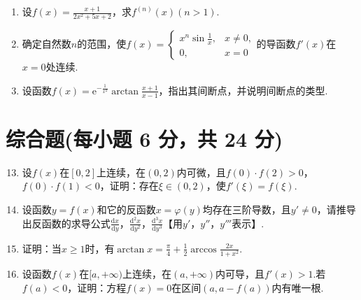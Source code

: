 \documentclass[../Main.tex]{subfiles}
\begin{document}
\begin{enumerate}
    \item 设$f(x)=\frac{x+1}{2x^{2}+5x+2}$，求$f^{(n)}(x)(n>1)$.
          \vspace{8em}

    \item 确定自然数$n$的范围，使$f(x)=
              \begin{cases}
                  x^{n} \sin\frac{1}{x}, & x\neq0, \\
                  0,                     & x=0
              \end{cases}$的导函数$f'(x)$在$x=0$处连续.
          \vspace{8em}

    \item 设函数$f(x)=\mathrm{e}^{-\frac{1}{x^{2}}}\arctan\frac{x+1}{x-1}$，指出其间断点，并说明间断点的类型.
          \vspace{8em}
\end{enumerate}

\section{综合题(每小题 6 分，共 24 分)}
\begin{enumerate}
    \setcounter{enumi}{12}
    \item 设$f(x)$在$[0,2]$上连续，在$(0,2)$内可微，且$f(0)\cdot f(2)>0$，$f
              (0)\cdot f(1)<0$，证明：存在$\xi\in(0,2)$，使$f'(\xi)=f(\xi)$.
          \vspace{9em}

    \item 设函数$y=f(x)$和它的反函数$x=\varphi(y)$均存在三阶导数，且$y'\neq0$，请推导出反函数的求导公式$\frac{\mathrm{d}x}{\mathrm{d}y}$，$\frac{\mathrm{d}^{2}
                  x}{\mathrm{d}y^{2}}$，$\frac{\mathrm{d}^{3} x}{\mathrm{d}y^{3}}$【用$y'$，$y
              ''$，$y'''$表示】.
          \vspace{9em}

    \item 证明：当$x\geq1$时，有$\arctan x=\frac{\pi}{4}+\frac{1}{2}\arccos\frac{2x}{1+x^{2}}$.
          \vspace{10em}

    \item 设函数$f(x)$在$[a,+\infty)$上连续，在$(a,+\infty)$内可导，且$f'(x)
              >1$.若$f(a)<0$，证明：方程$f(x)=0$在区间$(a,a-f(a))$内有唯一根.
          \vspace{11em}
\end{enumerate}
\end{document}
